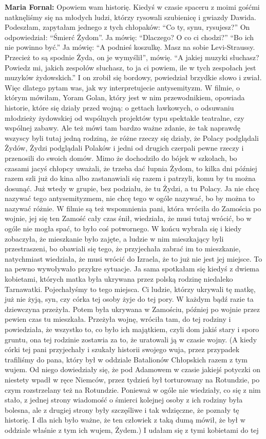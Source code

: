 \textbf{Maria Fornal:} Opowiem wam historię. Kiedyś w czasie spaceru z moimi gośćmi natknęliśmy się na młodych ludzi, którzy rysowali szubienicę i gwiazdy Dawida. Podeszłam, zapytałam jednego z tych chłopaków: "`Co ty, synu, rysujesz?"' On odpowiedział: "`Śmierć Żydom"'. Ja mówię: "`Dlaczego? O co ci chodzi?"' "`Bo ich nie powinno być."' Ja mówię: "`A podnieś koszulkę. Masz na sobie Levi-Straussy. Przecież to są spodnie Żyda, on je wymyślił"', mówię. "`A jakiej muzyki słuchasz? Powiedz mi, jakich zespołów słuchasz, to ja ci powiem, ile w tych zespołach jest muzyków żydowskich."' I on zrobił się bordowy, powiedział brzydkie słowo i zwiał. Więc dlatego pytam was, jak wy interpretujecie antysemityzm. W filmie, o którym mówiłam, Yoram Golan, który jest w nim przewodnikiem, opowiada historie, które się działy przed wojną: o gettach ławkowych, o odsuwaniu młodzieży żydowskiej od wspólnych projektów typu spektakle teatralne, czy wspólnej zabawy. Ale też mówi tam bardzo ważne zdanie, że tak naprawdę wszyscy byli tutaj jedną rodziną, że różne rzeczy się działy, że Polacy podglądali Żydów, Żydzi podglądali Polaków i jedni od drugich czerpali pewne rzeczy i przenosili do swoich domów. Mimo że dochodziło do bójek w szkołach, bo czasami jacyś chłopcy uważali, że trzeba dać łupnia Żydom, to kilka dni później razem szli już do kina albo zastanawiali się razem i patrzyli, komu by tu można dosunąć. Już wtedy w grupie, bez podziału, że tu Żydzi, a tu Polacy. Ja nie chcę nazywać tego antysemityzmem, nie chcę tego w ogóle nazywać, bo by można to nazywać różnie. W filmie są też wspomnienia pani, która wróciła do Zamościa po wojnie, jej się ten Zamość cały czas śnił, wiedziała, że musi tutaj wrócić, bo w ogóle nie mogła spać, to było coś potwornego. W końcu wybrała się i kiedy zobaczyła, że mieszkanie było zajęte, a ludzie w nim mieszkający byli przestraszeni, bo obawiali się tego, że przyjechała zabrać im to mieszkanie, natychmiast wiedziała, że musi wrócić do Izraela, że to już nie jest jej miejsce. To na pewno wywoływało przykre sytuacje. Ja sama spotkałam się kiedyś z dwiema kobietami, których matka była ukrywana przez polską rodzinę niedaleko Tarnawatki. Pojechałyśmy to tego miejsca. Ci ludzie, którzy ukrywali tę matkę, już nie żyją, syn, czy córka tej osoby żyje do tej pory. W każdym bądź razie ta dziewczyna przeżyła. Potem była ukrywana w Zamościu, później po wojnie przez pewien czas tu mieszkała. Przeżyła wojnę, wróciła tam, do tej rodziny i powiedziała, że wszystko to, co było ich majątkiem, czyli dom jakiś stary i sporo gruntu, ona tej rodzinie zostawia za to, że uratowali ją w czasie wojny. (A kiedy córki tej pani przyjechały i szukały historii swojego wuja, przez przypadek trafiliśmy do pana, który był w oddziale Batalionów Chłopskich razem z tym wujem. Od niego dowiedziały się, że pod Adamowem w czasie jakiejś potyczki on niestety wpadł w ręce Niemców, przez tydzień był torturowany na Rotundzie, po czym rozstrzelany też na Rotundzie. Ponieważ w ogóle nie wiedziały, co się z nim stało, z jednej strony wiadomość o śmierci kolejnej osoby z ich rodziny była bolesna, ale z drugiej strony były szczęśliwe i tak wdzięczne, że poznały tę historię. I dla nich było ważne, że ten człowiek z taką dumą mówił, że był w oddziale właśnie z tym ich wujem, Żydem.) I udałam się z tymi kobietami do tej 